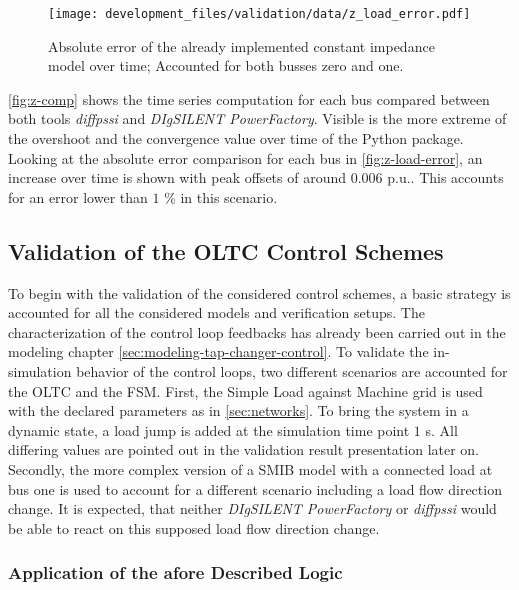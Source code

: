 \begin{figure}[htbp!]
    \centering
    \texttt{[image: development\_files/validation/data/z\_load\_error.pdf]}
    \caption[Absolute error comparison of the constant impedance model]{Absolute error of the already implemented constant impedance model over time; Accounted for both busses zero and one.}
    \label{fig:z-load-error}
\end{figure}

\autoref{fig:z-comp} shows the time series computation for each bus compared between both tools \textit{diffpssi} and \textit{DIgSILENT PowerFactory}.
Visible is the more extreme of the overshoot and the convergence value over time of the Python package.
Looking at the absolute error comparison for each bus in \autoref{fig:z-load-error}, an increase over time is shown with peak offsets of around $0.006$ p.u..
This accounts for an error lower than $1$ \% in this scenario.

\subsection{Validation of the OLTC Control Schemes}
\label{sec:validation-oltc-schemes}

To begin with the validation of the considered control schemes, a basic strategy is accounted for all the considered models and verification setups.
The characterization of the control loop feedbacks has already been carried out in the modeling chapter \autoref{sec:modeling-tap-changer-control}.
To validate the in-simulation behavior of the control loops, two different scenarios are accounted for the \acs{OLTC} and the \acs{FSM}.
First, the Simple Load against Machine grid is used with the declared parameters as in \autoref{sec:networks}.
To bring the system in a dynamic state, a load jump is added at the simulation time point $1$ s.
All differing values are pointed out in the validation result presentation later on.
Secondly, the more complex version of a \acs{SMIB} model with a connected load at bus one is used to account for a different scenario including a load flow direction change.
It is expected, that neither \textit{DIgSILENT PowerFactory} or \textit{diffpssi} would be able to react on this supposed load flow direction change.

\subsubsection{Application of the afore Described Logic}


